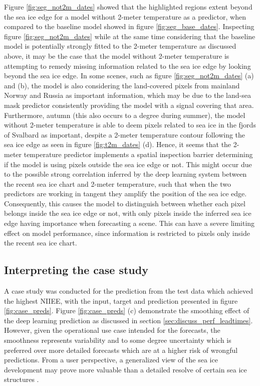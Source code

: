 \documentclass[../main/thesis]{subfiles}
\begin{document}
Figure \ref{fig:seg_not2m_dates} showed that the highlighted regions extent beyond the sea ice edge for a model without 2-meter temperature as a predictor, when compared to the baseline model showed in figure \ref{fig:seg_base_dates}. Inspecting figure \ref{fig:seg_not2m_dates} while at the same time considering that the baseline model is potentially strongly fitted to the 2-meter temperature as discussed above, it may be the case that the model without 2-meter temperature is attempting to remedy missing information related to the sea ice edge by looking beyond the sea ice edge. In some scenes, such as figure \ref{fig:seg_not2m_dates} (a) and (b), the model is also considering the land-covered pixels from mainland Norway and Russia as important information, which may be due to the land-sea mask predictor consistently providing the model with a signal covering that area. Furthermore, autumn (this also occurs to a degree during summer), the model without 2-meter temperature is able to deem pixels related to sea ice in the fjords of Svalbard as important, despite a 2-meter temperature contour following the sea ice edge as seen in figure \ref{fig:t2m_dates} (d). Hence, it seems that the 2-meter temperature predictor implements a spatial inspection barrier determining if the model is using pixels outside the sea ice edge or not. This might occur due to the possible strong correlation inferred by the deep learning system between the recent sea ice chart and 2-meter temperature, such that when the two predictors are working in tangent they amplify the position of the sea ice edge. Consequently, this causes the model to distinguish between whether each pixel belongs inside the sea ice edge or not, with only pixels inside the inferred sea ice edge having importance when forecasting a scene. This can have a severe limiting effect on model performance, since information is restricted to pixels only inside the recent sea ice chart.

\subsection{Interpreting the case study}
A case study was conducted for the prediction from the test data which achieved the highest NIIEE, with the input, target and prediction presented in figure \ref{fig:case_preds}. Figure \ref{fig:case_preds} (c) demonstrate the smoothing effect of the deep learning prediction as discussed in section \ref{sec:discuss_perf_leadtimes}. However, given the operational use case intended for the forecasts, the smoothness represents variability and to some degree uncertainty which is preferred over more detailed forecasts which are at a higher risk of wrongful predictions. From a user perspective, a generalized view of the sea ice development may prove more valuable than a detailed resolve of certain sea ice structures \citep{Murphy1993}.
\end{document}
